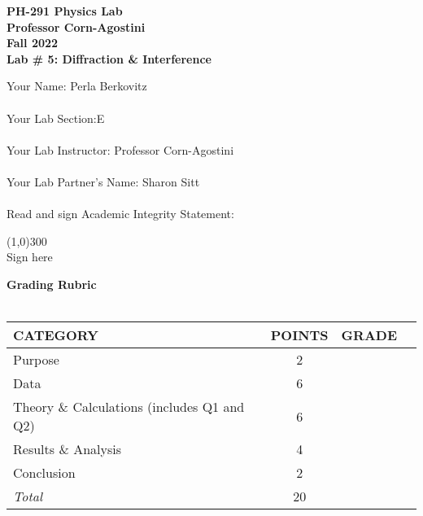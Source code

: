 

\begin{titlepage}

        \begin{center}
        \textbf{\huge PH-291 Physics Lab} \\ 
        \textbf{\Large Professor Corn-Agostini} \\ 
        \textbf{\Large Fall 2022} \\ 
        \vspace*{.5cm}  
        \textbf{\large Lab \# 5: Diffraction \& Interference}
        \vspace{0.5cm}
        \end{center}
       
\noindent Your Name: Perla Berkovitz\\ \\
\noindent Your Lab Section:E\\ \\
\noindent Your Lab Instructor: Professor Corn-Agostini\\ \\
\noindent Your Lab Partner's Name: Sharon Sitt\\ \\
\noindent Read and sign Academic Integrity Statement:\\


    \begin{center}
    \line(1,0){300} \\
    Sign here
    \end{center}

\noindent\textbf{\large Grading Rubric} \\ \\
\renewcommand{\arraystretch}{1.5}
\begin{tabular}{|l|c|r|l|} \hline
 {\bf CATEGORY} & {\bf POINTS} & {\bf GRADE}\\\hline 
Purpose & 2 & \\\hline
Data & 6 & \\\hline
Theory \& Calculations (includes Q1 and Q2) & 6 & \\\hline 
Results \& Analysis & 4 & \\\hline 
Conclusion  & 2 & \\\hline \hline 
{\em Total} & 20 & \\ \hline
\end{tabular}

\end{titlepage} 


